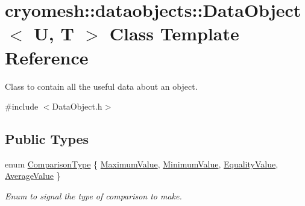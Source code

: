 \hypertarget{classcryomesh_1_1dataobjects_1_1DataObject}{\section{cryomesh\-:\-:dataobjects\-:\-:\-Data\-Object$<$ \-U, \-T $>$ \-Class \-Template \-Reference}
\label{classcryomesh_1_1dataobjects_1_1DataObject}
}


\-Class to contain all the useful data about an object.  




{\ttfamily \#include $<$\-Data\-Object.\-h$>$}

\subsection*{\-Public \-Types}
\begin{DoxyCompactItemize}
\item 
enum \hyperlink{classcryomesh_1_1dataobjects_1_1DataObject_a88c071e82534aa8b82c336a8104f9df8}{\-Comparison\-Type} \{ \hyperlink{classcryomesh_1_1dataobjects_1_1DataObject_a88c071e82534aa8b82c336a8104f9df8a00afa6fa8995597a48446b10044adc31}{\-Maximum\-Value}, 
\hyperlink{classcryomesh_1_1dataobjects_1_1DataObject_a88c071e82534aa8b82c336a8104f9df8adae0956c6e44c6d998d47407b6c1c9cd}{\-Minimum\-Value}, 
\hyperlink{classcryomesh_1_1dataobjects_1_1DataObject_a88c071e82534aa8b82c336a8104f9df8a9d1e58881794d424bd4759039d034741}{\-Equality\-Value}, 
\hyperlink{classcryomesh_1_1dataobjects_1_1DataObject_a88c071e82534aa8b82c336a8104f9df8abb8ba259cb26552c16f621c559f3e23d}{\-Average\-Value}
 \}
\begin{DoxyCompactList}\small\item\em \-Enum to signal the type of comparison to make. \end{DoxyCompactList}\end{DoxyCompactItemize}
